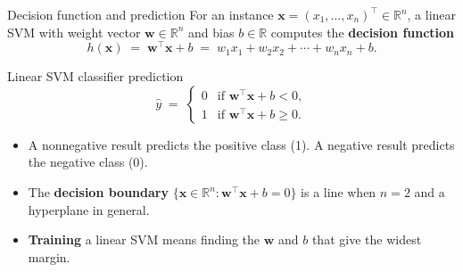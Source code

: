 \documentclass[aspectratio=169,10pt]{beamer}
\newcommand{\R}{\mathbb{R}}
\newcommand{\w}{\mathbf{w}}
\newcommand{\x}{\mathbf{x}}
\begin{document}
\begin{frame}{Decision function and prediction}
For an instance $\x = (x_1,\dots,x_n)^\top \in \R^n$, a linear SVM with weight vector $\w\in\R^n$ and bias $b\in\R$ computes the \textbf{decision function}
\[
  h(\x) \;=\; \w^\top\x + b \;=\; w_1x_1 + w_2x_2 + \cdots + w_nx_n + b .
\]

\begin{block}{Linear SVM classifier prediction}
\[
  \hat y \;=\;
  \begin{cases}
    0 & \text{if } \w^\top\x + b < 0,\\[2pt]
    1 & \text{if } \w^\top\x + b \ge 0.
  \end{cases}
\]
\end{block}

\begin{itemize}
  \item A nonnegative result predicts the positive class (1). A negative result predicts the negative class (0).
  \item The \textbf{decision boundary} $\{\x\in\R^n : \w^\top\x + b = 0\}$ is a line when $n=2$ and a hyperplane in general.
  \item \textbf{Training} a linear SVM means finding the $\w$ and $b$ that give the widest margin.
\end{itemize}
\end{frame}
\end{document}
